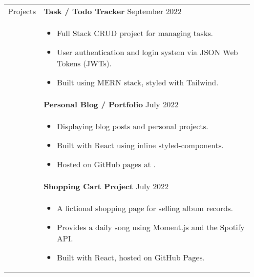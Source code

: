 \documentclass[11pt]{article}
\begin{document}
\begin{minipage}[t][0pt]{\linewidth} %
    \begin{tabular}[t]{p{2cm} p{14cm}}
    	{Projects} &

		\textbf{Task / Todo Tracker}  \hfill September 2022 \\ &
		\begin{itemize}
			\renewcommand{\labelitemi}{$\diamond$}
			\item Full Stack CRUD project for managing tasks.
			\item User authentication and login system via JSON Web Tokens (JWTs).
			\item Built using MERN stack, styled with Tailwind.
		\end{itemize} \\ &

		\textbf{Personal Blog / Portfolio}  \hfill July 2022 \\ &
		\begin{itemize}
			\renewcommand{\labelitemi}{$\diamond$}
			\item Displaying blog posts and personal projects.
			\item Built with React using inline styled-components. 
			\item Hosted on GitHub pages at \href{jluong23.github.io/blog}{\color{Blue}{jluong23.github.io/blog}}.
		\end{itemize} \\ &

		\textbf{Shopping Cart Project}  \hfill July 2022 \\ &
		\begin{itemize}
			\renewcommand{\labelitemi}{$\diamond$}
			\item A fictional shopping page for selling album records. 
			\item Provides a daily song using Moment.js and the Spotify API.
			\item Built with React, hosted on GitHub Pages.
		\end{itemize} \\


\end{tabular}
\end{minipage}
\end{document}
